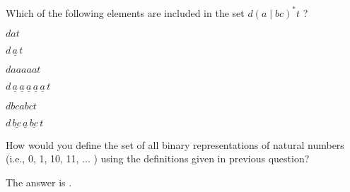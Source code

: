 \documentclass{ximera}
\begin{document}
Which of the following elements are included in the set $d (a \mid bc)^*t  $ ?

\begin{question}
$dat$
\begin{solution}
\begin{multipleChoice}
\end{multipleChoice}
$d \, \underline{a} \, t$
\end{solution}
\end{question}

\begin{question}
$daaaaat$
\begin{solution}
\begin{multipleChoice}
\end{multipleChoice}
$d \, \underline{a} \, \underline{a} \, \underline{a} \, \underline{a} \, \underline{a} \, t$
\end{solution}
\end{question}

\begin{question}
$dbcabct$
\begin{solution}
\begin{multipleChoice}
\end{multipleChoice}
$d \, \underline{bc} \, \underline{a} \, \underline{bc} \, t$
\end{solution}
\end{question}


\begin{question}
How would you define the set of all binary representations of natural numbers (i.e., 0, 1, 10, 11, ... ) using the definitions given in previous question?

\begin{solution}%
The answer is .
\end{solution}
\end{question}
\end{document}
